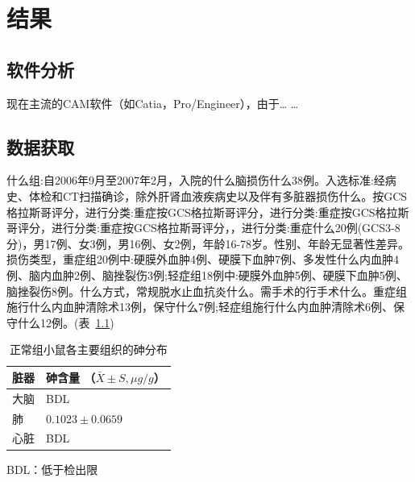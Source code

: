 \chapter{结果} \label{chap:results}
\section{软件分析}\label{sec:results:software}
现在主流的CAM软件（如Catia，Pro/Engineer），由于…
…
\section{数据获取}\label{sec:results:getdata}
什么组:自2006年9月至2007年2月，入院的什么脑损伤什么38例。入选标准:经病史、体检和CT扫描确诊，除外肝肾血液疾病史以及伴有多脏器损伤什么。按GCS格拉斯哥评分，进行分类:重症按GCS格拉斯哥评分，进行分类:重症按GCS格拉斯哥评分，进行分类:重症按GCS格拉斯哥评分，，进行分类:重症什么20例(GCS3-8分)，男17例、女3例，男16例、女2例，年龄16-78岁。性别、年龄无显著性差异。损伤类型，重症组20例中:硬膜外血肿4例、硬膜下血肿7例、多发性什么内血肿4例、脑内血肿2例、脑挫裂伤3例;轻症组18例中:硬膜外血肿5例、硬膜下血肿5例、脑挫裂伤8例。什么方式，常规脱水止血抗炎什么。需手术的行手术什么。重症组施行什么内血肿清除术13例，保守什么7例;轻症组施行什么内血肿清除术6例、保守什么12例。(表~\ref{tab:mice-As})

\begin{table}[!htbp]
    \begin{center}
	\begin{minipage}{0.6\textwidth}
    \caption[正常组小鼠各主要组织的砷分布]{\enspace 正常组小鼠各主要组织的砷分布}
    \label{tab:mice-As}
    \normalsize%
    \setlength{\tabcolsep}{4pt}%
    \begin{tabular}{m{100pt}<{\raggedright}m{110pt}<{\raggedright}}
    \toprule
    脏器 & 砷含量 （$\bar{X} \pm S, \mu g/g$）\\
    \midrule
    大脑 &  BDL\\
    肺 &  $0.1023 \pm 0.0659$\\
    心脏 &  BDL\\
    \bottomrule
    \end{tabular}
    {\newline BDL：低于检出限}
\end{minipage}
\end{center}
\end{table}

